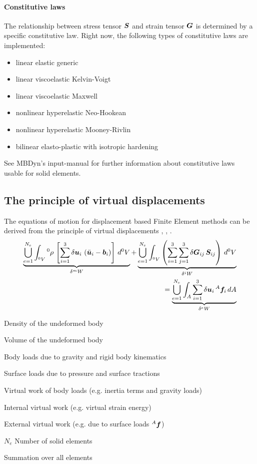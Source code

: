 \paragraph{Constitutive laws}
The relationship between stress tensor $\bm{S}$ and strain tensor $\bm{G}$ is determined by a specific constitutive law.
Right now, the following types of constitutive laws are implemented:
\begin{itemize}
\item linear elastic generic
\item linear viscoelastic Kelvin-Voigt \cite{KUEBLER2005}
\item linear viscoelastic Maxwell \cite{bleyer2018numericaltours}
\item nonlinear hyperelastic Neo-Hookean \cite{KUEBLER2005}
\item nonlinear hyperelastic Mooney-Rivlin \cite{BATHE2016}
\item bilinear elasto-plastic with isotropic hardening \cite{BATHE2016}
\end{itemize}
See MBDyn's input-manual for further information about constitutive laws usable for solid elements.

\subsection{The principle of virtual displacements}
The equations of motion for displacement based Finite Element methods can be derived from the principle of virtual displacements \cite{WALLRAPP1998}, \cite{BATHE2016}, \cite{KUEBLER2005}.
\begin{eqnarray}
\underbrace{\bigcup_{e=1}^{N_e}\int_{^0V} {^0}\rho \, \left[\sum_{i=1}^3 \delta\bm{u}_i\,\left(\ddot{\bm{u}}_i - \bm{b}_i\right) \right]\, d^0V}_{\delta ^mW} + \underbrace{\bigcup_{e=1}^{N_e}\int_{^0V} \left(\sum_{i=1}^3\sum_{j=1}^3 \delta\bm{G}_{ij}\,\bm{S}_{ij} \right) \, d^0V}_{\delta^iW} \nonumber \\
= \underbrace{\bigcup_{e=1}^{N_e}\int_{A} \sum_{i=1}^3 \delta\bm{u}_i\,^A\bm{f}_i \,dA}_{\delta^eW}
\end{eqnarray}

\begin{description}
\item[${^0}\rho$] Density of the undeformed body
\item[${^0}V$] Volume of the undeformed body
\item[$\T{b}$] Body loads due to gravity and rigid body kinematics
\item[${^A}\T{f}$] Surface loads due to pressure and surface tractions
\item[${^m}W$] Virtual work of body loads (e.g. inertia terms and gravity loads)
\item[${^i}W$] Internal virtual work (e.g. virtual strain energy)
\item[${^e}W$] External virtual work (e.g. due to surface loads ${^A}\T{f}$)
\item{$N_e$} Number of solid elements
\item[$\bigcup$] Summation over all elements
\end{description}

